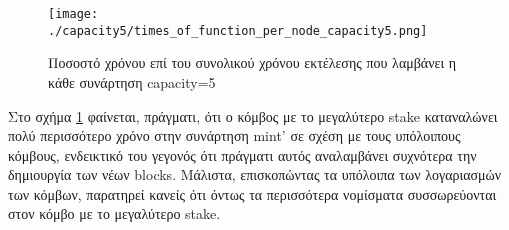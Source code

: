 \documentclass{article}
\newcommand{\eng}[1]{\foreignlanguage{english}{#1}} %
\begin{document}
\begin{figure}[ht]
    \centering
    \texttt{[image: ./capacity5/times\_of\_function\_per\_node\_capacity5.png]}
    \caption{Ποσοστό χρόνου επί του συνολικού χρόνου εκτέλεσης που λαμβάνει η κάθε συνάρτηση \eng{capacity=5}}
    \label{fig:fairness-funcs}
\end{figure}
\FloatBarrier

Στο σχήμα \ref{fig:fairness-funcs} φαίνεται, πράγματι, ότι ο κόμβος με το
μεγαλύτερο \eng{stake} καταναλώνει πολύ περισσότερο χρόνο στην συνάρτηση
\eng{mint'} σε σχέση με τους υπόλοιπους κόμβους, ενδεικτικό του γεγονός ότι
πράγματι αυτός αναλαμβάνει συχνότερα την δημιουργία των νέων \eng{blocks}.
Μάλιστα, επισκοπώντας τα υπόλοιπα των λογαριασμών των κόμβων, παρατηρεί κανείς
ότι όντως τα περισσότερα νομίσματα συσσωρεύονται στον κόμβο με το μεγαλύτερο
\eng{stake}.
\end{document}
